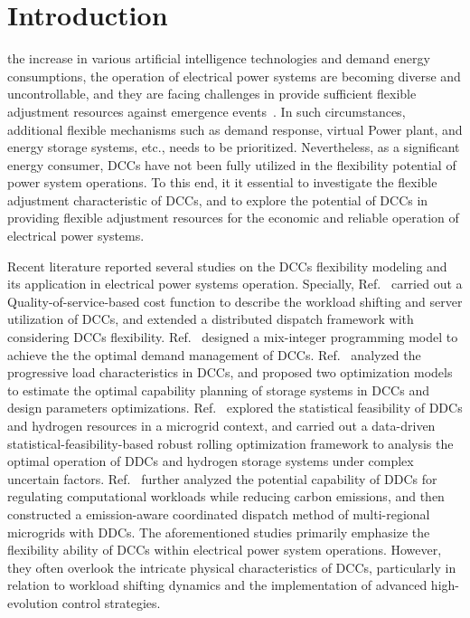 \documentclass[lettersize,journal]{IEEEtran}
\begin{document}
\section{Introduction}
 the increase in various artificial intelligence technologies and demand energy consumptions, the operation of electrical power systems are becoming diverse and uncontrollable, and they are facing challenges in provide sufficient flexible adjustment resources against emergence events~\cite{6041050,7039172}. In such circumstances, additional flexible mechanisms such as demand response, virtual Power plant, and energy storage systems, etc., needs to be prioritized. Nevertheless, as a significant energy consumer, DCCs have not been fully utilized in the flexibility potential of power system operations. To this end, it it essential to investigate the flexible adjustment characteristic of DCCs, and to explore the potential of DCCs in providing flexible adjustment resources for the economic and reliable operation of electrical power systems.

Recent literature reported several studies on the DCCs flexibility modeling and its application in electrical power systems operation. Specially, 
Ref.~\cite{10874152} carried out a Quality-of-service-based cost function to describe the workload shifting and server utilization of DCCs, and extended a distributed dispatch framework with considering DCCs flexibility.
Ref.~\cite{6041050} designed a mix-integer programming model to achieve the the optimal demand management of DCCs.
Ref.~\cite{7039172} analyzed the progressive load characteristics in DCCs, and proposed two optimization models to estimate the optimal capability planning of storage systems in DCCs and design parameters optimizations.
Ref.~\cite{10806734} explored the statistical feasibility of DDCs and hydrogen resources in a microgrid context, and carried out a data-driven statistical-feasibility-based robust rolling optimization framework to analysis the optimal operation of DDCs and hydrogen storage systems under complex uncertain factors.
Ref.~\cite{doi:10.1049/icp.2025.0664} further analyzed the potential capability of DDCs for regulating computational workloads while reducing carbon emissions, and then constructed a emission-aware coordinated dispatch method of multi-regional microgrids with DDCs.
The aforementioned studies primarily emphasize the flexibility ability of DCCs within electrical power system operations. However, they often overlook the intricate physical characteristics of DCCs, particularly in relation to workload shifting dynamics and the implementation of advanced high-evolution control strategies.
\end{document}
